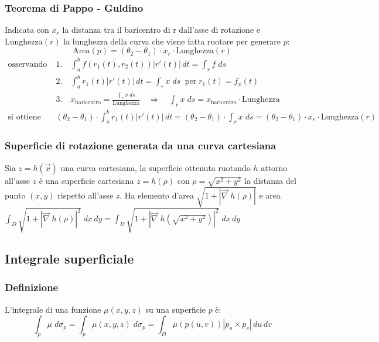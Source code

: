 \documentclass[a4paper]{article}
\newcommand\nab{\vec{\nabla}} %
\begin{document}
\subsubsection*{Teorema di Pappo - Guldino}
Indicata con \(x_r\) la distanza tra il baricentro di r dall'asse di rotazione e Lunghezza\((r)\) la lunghezza della curva che viene
fatta ruotare per generare \(p\):
\[\text{Area}(p) = (\theta_2 - \theta_1) \cdot x_r \cdot \text{Lunghezza}(r)\]
\begin{align*}
	\text{osservando che} \; &1. \quad \int_a^b f(r_1(t),r_2(t)) \left|r'(t)\right| \, dt = \int_r f \; ds \\
	&2. \quad \int_a^b r_1(t) \left|r'(t)\right| \, dt = \int_r x \; ds \;\; \text{per} \; r_1(t) = f_x(t) \\
	&3. \quad x_\text{baricentro} = \frac{\int_r x \; ds}{\text{Lunghezza}} \quad \Rightarrow \quad \int_r x \; ds = x_\text{baricentro} \cdot \text{Lunghezza} \\
	\text{si ottiene che} \; &(\theta_2 - \theta_1) \cdot \int_a^b r_1(t) \left|r'(t)\right| \, dt = (\theta_2 - \theta_1) \cdot \int_r x \; ds = (\theta_2 - \theta_1) \cdot x_r \cdot \text{Lunghezza}(r)
\end{align*}

\subsubsection*{Superficie di rotazione generata da una curva cartesiana}
Sia \(z = h(\vec{x})\) una curva cartesiana, la superficie ottenuta ruotando \(h\) attorno all'asse \(z\) è una superficie cartesiana \(z = h(\rho)\)
con \(\rho = \sqrt{x^2+y^2}\) la distanza del punto \((x,y)\) rispetto all'asse \(z\). Ha elemento d'area \(\sqrt{ 1 + \left| \nab \; h(\rho)\right|}\)
e area \(\displaystyle \int_D \sqrt{ 1 + \left| \nab \; h(\rho)\right|^2} \; dx \, dy = \int_D \sqrt{ 1 + \left| \nab \; h \left(\sqrt{x^2 + y^2}\right)\right|^2} \; dx \, dy\)

\subsection{Integrale superficiale}
\subsubsection*{Definizione}
L'integrale di una funzione \(\mu(x,y,z)\) su una superficie \(p\) è:
\[\int_p \mu \; d\sigma_p = \int_p \mu(x,y,z) \; d\sigma_p= \int_D \mu(p(u,v)) \left|p_u \times p_v\right| \, du \, dv\]
\end{document}
